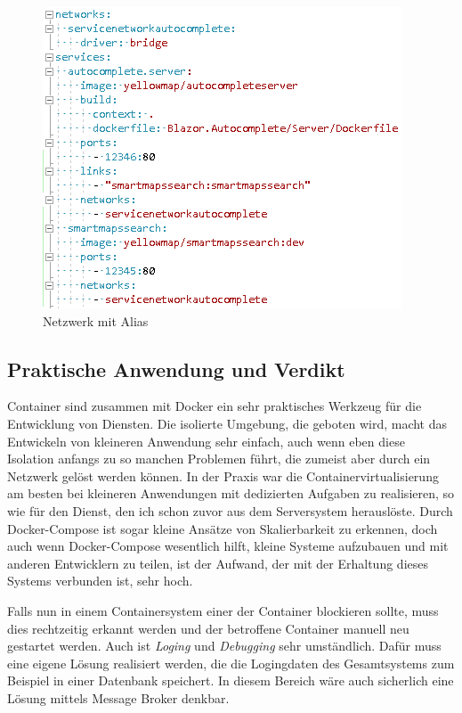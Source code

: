 \documentclass[12pt,a4paper]{scrartcl}
\begin{document}
\begin{figure}[h!]
	\centering
	\includegraphics[scale=1]{DockerComposeNetwork.png}
	\caption[Screenshot]{Netzwerk mit Alias}
\end{figure}

\subsection{Praktische Anwendung und Verdikt}

Container sind zusammen mit Docker ein sehr praktisches Werkzeug für die Entwicklung von Diensten. Die isolierte Umgebung, die geboten wird, macht das Entwickeln von kleineren Anwendung  sehr einfach, auch wenn eben diese Isolation anfangs zu so manchen Problemen führt, die zumeist aber durch ein Netzwerk gelöst werden können. In der Praxis war die Containervirtualisierung am besten bei kleineren Anwendungen mit dedizierten Aufgaben zu realisieren, so wie für den Dienst, den ich schon zuvor aus dem Serversystem herauslöste. Durch Docker-Compose ist sogar kleine Ansätze von Skalierbarkeit zu erkennen, doch auch wenn Docker-Compose wesentlich hilft, kleine Systeme aufzubauen und mit anderen Entwicklern zu teilen, ist der Aufwand, der mit der Erhaltung dieses Systems verbunden ist, sehr hoch.

Falls nun in einem Containersystem einer der Container blockieren sollte, muss dies rechtzeitig erkannt werden und der betroffene Container manuell neu gestartet werden. Auch ist \emph{Loging} und \emph{Debugging} sehr umständlich. Dafür muss eine eigene Lösung realisiert werden, die die Logingdaten des Gesamtsystems zum Beispiel in einer Datenbank speichert. In diesem Bereich wäre auch sicherlich eine Lösung mittels Message Broker denkbar.
\end{document}
